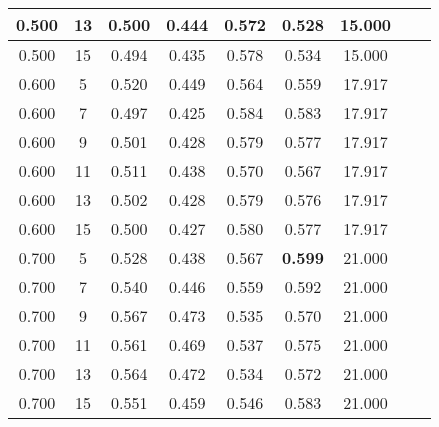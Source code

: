 \begin{longtable}[c]{|c|c|c|c|c|c|c|c|c|}
 0.500 & 13 & 0.500 & 0.444 & 0.572 & 0.528 & 15.000  \\ \hline 
 0.500 & 15 & 0.494 & 0.435 & 0.578 & 0.534 & 15.000  \\ \hline 
 0.600 & 5 & 0.520 & 0.449 & 0.564 & 0.559 & 17.917  \\ \hline 
 0.600 & 7 & 0.497 & 0.425 & 0.584 & 0.583 & 17.917  \\ \hline 
 0.600 & 9 & 0.501 & 0.428 & 0.579 & 0.577 & 17.917  \\ \hline 
 0.600 & 11 & 0.511 & 0.438 & 0.570 & 0.567 & 17.917  \\ \hline 
 0.600 & 13 & 0.502 & 0.428 & 0.579 & 0.576 & 17.917  \\ \hline 
 0.600 & 15 & 0.500 & 0.427 & 0.580 & 0.577 & 17.917  \\ \hline 
 0.700 & 5 & 0.528 & 0.438 & 0.567 & \cellcolor{gray!20} \textbf{0.599} & 21.000  \\ \hline 
 0.700 & 7 & 0.540 & 0.446 & 0.559 & 0.592 & 21.000  \\ \hline 
 0.700 & 9 & 0.567 & 0.473 & 0.535 & 0.570 & 21.000  \\ \hline 
 0.700 & 11 & 0.561 & 0.469 & 0.537 & 0.575 & 21.000  \\ \hline 
 0.700 & 13 & 0.564 & 0.472 & 0.534 & 0.572 & 21.000  \\ \hline 
 0.700 & 15 & 0.551 & 0.459 & 0.546 & 0.583 & 21.000  \\ \hline 
 \end{longtable} 

\newpage

